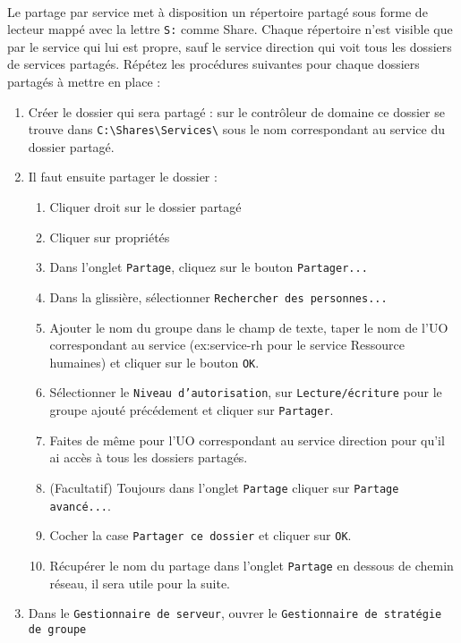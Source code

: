 			\paragraph{}
				Le partage par service met à disposition un répertoire partagé sous forme de lecteur mappé avec la lettre \texttt{S:} comme Share. Chaque répertoire n'est visible que par le service qui lui est propre, sauf le service direction qui voit tous les dossiers de services partagés. Répétez les procédures suivantes pour chaque dossiers partagés à mettre en place :
				\begin{enumerate}
					\item Créer le dossier qui sera partagé : sur le contrôleur de domaine ce dossier se trouve dans \texttt{C:\textbackslash{}Shares\textbackslash{}Services\textbackslash} sous le nom correspondant au service du dossier partagé.
					\item Il faut ensuite partager le dossier : 
						\begin{enumerate}
							\item Cliquer droit sur le dossier partagé
							\item Cliquer sur propriétés
							\item Dans l'onglet \texttt{Partage}, cliquez sur le bouton \texttt{Partager...}
							\item Dans la glissière, sélectionner \texttt{Rechercher des personnes...}
							\item Ajouter le nom du groupe dans le champ de texte, taper le nom de l'UO correspondant au service (ex:service-rh pour le service Ressource humaines) et cliquer sur le bouton \texttt{OK}.
							\item Sélectionner le \texttt{Niveau d'autorisation}, sur \texttt{Lecture/écriture} pour le groupe ajouté précédement et cliquer sur \texttt{Partager}.
							\item Faites de même pour l'UO correspondant au service direction pour qu'il ai accès à tous les dossiers partagés.
							\item (Facultatif) Toujours dans l'onglet \texttt{Partage} cliquer sur \texttt{Partage avancé...}.
							\item Cocher la case \texttt{Partager ce dossier} et cliquer sur \texttt{OK}.
							\item Récupérer le nom du partage dans l'onglet \texttt{Partage} en dessous de chemin réseau, il sera utile pour la suite.
						\end{enumerate}  
						\item Dans le \texttt{Gestionnaire de serveur}, ouvrer le \texttt{Gestionnaire de stratégie de groupe}

\end{enumerate}
